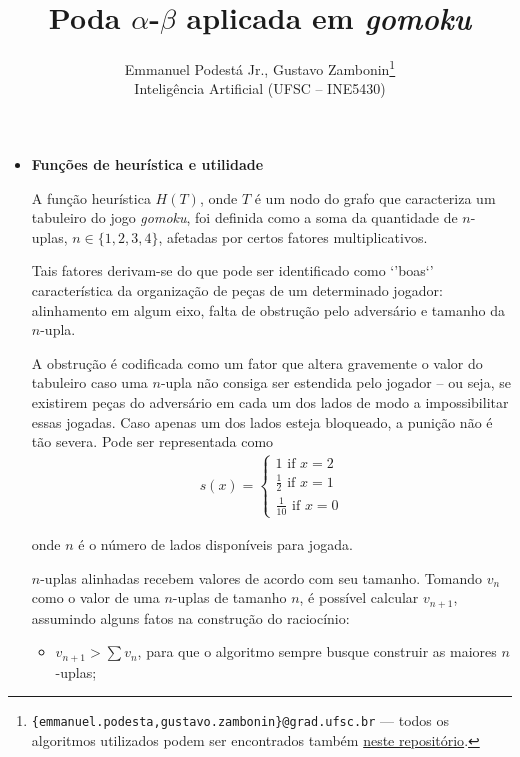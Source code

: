 \documentclass{article}
\title{\textbf{Poda $\alpha$-$\beta$ aplicada em \textit{gomoku}}}
\author{Emmanuel Podestá Jr., Gustavo Zambonin\thanks{
    \texttt{\{emmanuel.podesta,gustavo.zambonin\}@grad.ufsc.br} --- todos os
    algoritmos utilizados podem ser encontrados também
    \href{https://github.com/zambonin/ufsc-ine5430}{neste repositório}.} \\
\small {Inteligência Artificial (UFSC -- INE5430)} \vspace{-5mm}}
\date{}
\begin{document}
\maketitle

\begin{itemize}

    \item \textbf{Funções de heurística e utilidade}

        A função heurística $H(T)$, onde $T$ é um nodo do grafo que
        caracteriza um tabuleiro do jogo \textit{gomoku}, foi definida como
        a soma da quantidade de $n$- uplas, $n \in \{1, 2, 3, 4\}$, afetadas
        por certos fatores multiplicativos.

        Tais fatores derivam-se do que pode ser identificado como `'boas`'
        característica da organização de peças de um determinado jogador:
        alinhamento em algum eixo, falta de obstrução pelo adversário e
        tamanho da $n$-upla.

        A obstrução é codificada como um fator que altera gravemente o valor
        do tabuleiro caso uma $n$-upla não consiga ser estendida pelo jogador
        -- ou seja, se existirem peças do adversário em cada um dos lados
        de modo a impossibilitar essas jogadas. Caso apenas um dos lados
        esteja bloqueado, a punição não é tão severa. Pode ser representada
        como
        \begin{align*}
            s(x) =
            \begin{cases}
                1 \text{ if } x = 2 \\
                \frac{1}{2} \text{ if } x = 1 \\
                \frac{1}{10} \text{ if } x = 0
            \end{cases}
        \end{align*}

        onde $n$ é o número de lados disponíveis para jogada.

        $n$-uplas alinhadas recebem valores de acordo com seu tamanho. Tomando
        $v_n$ como o valor de uma $n$-uplas de tamanho $n$, é possível
        calcular $v_{n + 1}$, assumindo alguns fatos na construção do
        raciocínio:
        
        \begin{itemize}
        
            \item $v_{n + 1} > \sum v_n$, para que o algoritmo sempre busque
                construir as maiores $n$-uplas;
                

\end{itemize}
\end{itemize}
\end{document}
